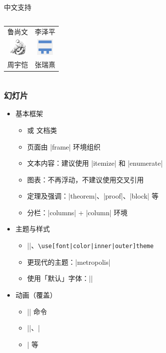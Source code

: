 \begin{frame}{中文支持}
\begin{columns}
\begin{column}{0.32\textwidth}
\begin{tabular}{cc}
    鲁尚文 & 李泽平 \\[2ex]
    \includegraphics[width=24pt]{images/muzimuzhi.jpg}     &
    \includegraphics[width=24pt]{images/ruixi-zhang.png}   \\
    周宇恺 & 张瑞熹
  \end{tabular}
  \vspace{-0.6cm}
\end{column}
\end{columns}
\end{frame}

\begin{frame}[fragile]
\frametitle{幻灯片}
\begin{itemize}
  \item<+-> 基本框架

    \begin{itemize}
      \item {} 或  文档类
      \item 页面由 |frame| 环境组织
      \item 文本内容：建议使用 |itemize| 和 |enumerate|
      \item 图表：不再浮动，不建议使用交叉引用
      \item 定理及强调：|theorem|、|proof|、|block| 等
      \item 分栏：|columns| + |column| 环境
    \end{itemize}

  \item<+-> 主题与样式

    \begin{itemize}
      \item |\usetheme|、\lstinline[style=style@inline]+\use[font|color|inner|outer]theme+
      \item 更现代的主题：|metropolis|
      \item 使用「默认」字体：||
    \end{itemize}

  \item<+-> 动画（覆盖）

    \begin{itemize}
      \item |\pause| 命令
      \item ||、|\item<1+>| 等
    \end{itemize}
\end{itemize}
\end{frame}

